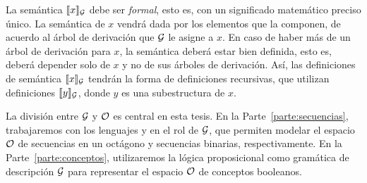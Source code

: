 La semántica $\sem{x}_\gram$ debe ser {\em formal}, esto es, con un significado matemático preciso único. La semántica de $x$ vendrá dada por los elementos que la componen, de acuerdo al árbol de derivación que $\gram$ le asigne a $x$. En caso de haber más de un árbol de derivación para $x$, la semántica deberá estar bien definida, esto es, deberá depender solo de $x$ y no de sus árboles de derivación. Así, las definiciones de semántica $\sem{x}_\gram$ tendrán la forma de definiciones recursivas, que utilizan definiciones $\sem{y}_\gram$, donde $y$ es una subestructura de $x$.



La división entre $\gram$ y $\+O$ es central en esta tesis.
En la Parte~\ref{parte:secuencias}, trabajaremos con los lenguajes \gramgeo y \grambin en el rol de $\gram$, que permiten modelar el espacio $\+O$ de secuencias en un octágono y secuencias binarias, respectivamente. En la Parte~\ref{parte:conceptos}, utilizaremos la lógica proposicional \grambool como gramática de descripción $\gram$ para representar el espacio $\+O$ de conceptos booleanos. 



